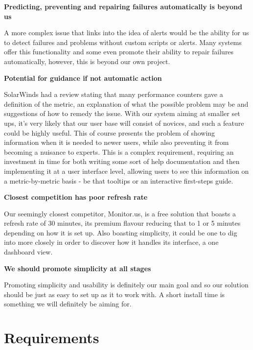 \documentclass{l3proj}
\begin{document}
\textbf{Predicting, preventing and repairing failures automatically is beyond us}

A more complex issue that links into the idea of alerts would be the ability for us to detect failures and problems without custom scripts or alerts. Many systems offer this functionality and some even promote their ability to repair failures automatically, however, this is beyond our own project.

\textbf{Potential for guidance if not automatic action}

SolarWinds had a review stating that many performance counters gave a definition of the metric, an explanation of what the possible problem may be and suggestions of how to remedy the issue. With our system aiming at smaller set ups, it’s very likely that our user base will consist of novices, and such a feature could be highly useful. This of course presents the problem of showing information when it is needed to newer users, while also preventing it from becoming a nuisance to experts. This is a complex requirement, requiring an investment in time for both writing some sort of help documentation and then implementing it at a user interface level, allowing users to see this information on a metric-by-metric basis - be that tooltips or an interactive first-steps guide.

\textbf{Closest competition has poor refresh rate}

Our seemingly closest competitor, Monitor.us, is a free solution that boasts a refresh rate of 30 minutes, its premium flavour reducing that to 1 or 5 minutes depending on how it is set up. Also boasting simplicity, it could be one to dig into more closely in order to discover how it handles its interface, a one dashboard view.

\textbf{We should promote simplicity at all stages}

Promoting simplicity and usability is definitely our main goal and so our solution should be just as easy to set up as it to work with. A short install time is something we will definitely be aiming for.



\chapter{Requirements}
\label{req}
\end{document}
